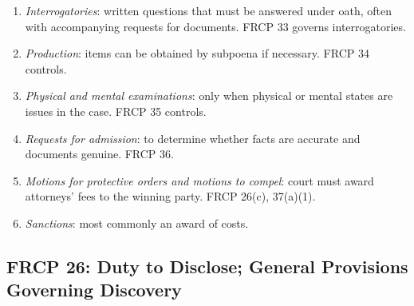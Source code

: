 \begin{enumerate}
\begin{enumerate}
\begin{enumerate}
        \end{enumerate}
        \item \emph{Interrogatories}: written questions that must be answered 
        under oath, often with accompanying requests for documents. FRCP 33 
        governs interrogatories.
        \item \emph{Production}: items can be obtained by subpoena if 
        necessary. FRCP 34 controls.
        \item \emph{Physical and mental examinations}: only when physical or 
        mental states are issues in the case. FRCP 35 controls.
        \item \emph{Requests for admission}: to determine whether facts are 
        accurate and documents genuine. FRCP 36.
        \item \emph{Motions for protective orders and motions to compel}: 
        court must award attorneys' fees to the winning party. FRCP 26(c), 
        37(a)(1).
        \item \emph{Sanctions}: most commonly an award of costs.
    \end{enumerate}
\end{enumerate}

\subsection{FRCP 26: Duty to Disclose; General Provisions Governing Discovery}

